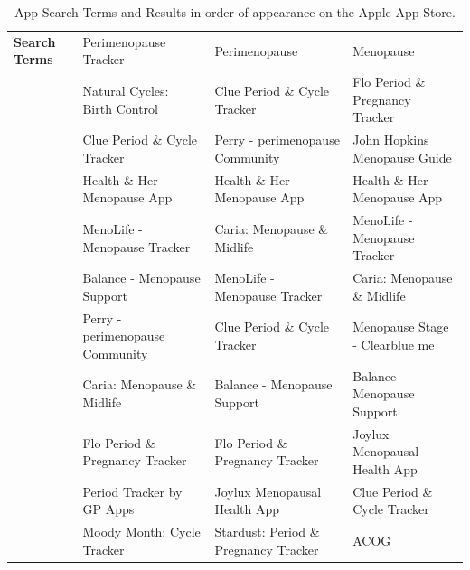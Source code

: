 \begin{table}[h!!]
    \begin{center}
      \caption{App Search Terms and Results in order of appearance on the Apple App Store.}
        \label{table:comparison-operators}
            \begin{tabular}{llll}
            \textbf{Search Terms} & Perimenopause Tracker           & Perimenopause                         & Menopause                       \\ \cline{2-4} 
                                  & Natural Cycles: Birth Control   & Clue Period \& Cycle Tracker          & Flo Period \& Pregnancy Tracker \\
                                  & Clue Period \& Cycle Tracker    & Perry - perimenopause Community       & John Hopkins Menopause Guide    \\
                                  & Health \& Her Menopause App     & Health \& Her Menopause App           & Health \& Her Menopause App     \\
                                  & MenoLife - Menopause Tracker    & Caria: Menopause \& Midlife           & MenoLife - Menopause Tracker    \\
                                  & Balance - Menopause Support     & MenoLife - Menopause Tracker          & Caria: Menopause \& Midlife     \\
                                  & Perry - perimenopause Community & Clue Period \& Cycle Tracker          & Menopause Stage - Clearblue me  \\
                                  & Caria: Menopause \& Midlife     & Balance - Menopause Support           & Balance - Menopause Support     \\
                                  & Flo Period \& Pregnancy Tracker & Flo Period \& Pregnancy Tracker       & Joylux Menopausal Health App    \\
                                  & Period Tracker by GP Apps       & Joylux Menopausal Health App          & Clue Period \& Cycle Tracker    \\
                                  & Moody Month: Cycle Tracker      & Stardust: Period \& Pregnancy Tracker & ACOG                           
            \end{tabular}
    \end{center}
  \end{table}


